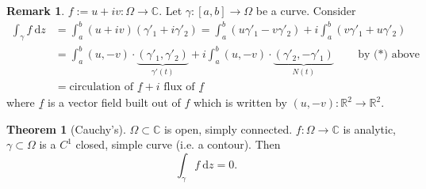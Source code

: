 \documentclass[a4paper]{article}
\theoremstyle{definition}
\newtheorem{thm}[defn]{Theorem}
\newtheorem*{remark}{Remark}
\begin{document}
\begin{remark}
$f:=u+iv: \Omega \rightarrow \mathbb C$. Let $\gamma:[a,b]\rightarrow \Omega$ be a curve. Consider
\[
\begin{aligned}
\int_\gamma f \ \mathrm d z &= \int_a^b (u+iv) (\gamma'_1+i \gamma'_2) = \int_a^b (u\gamma'_1 -v\gamma'_2) +i \int_a^b (v\gamma'_1 + u\gamma'_2) \\&=\int_a^b (u,-v) \cdot \underbrace{(\gamma'_1,\gamma'_2)}_{\gamma'(t)} + i\int_a^b (u,-v) \cdot \underbrace{(\gamma'_2,-\gamma'_1)}_{N(t)} \qquad \text{by ($\ast$) above} \\
&= \text{circulation of }\underline f + i \text{ flux of }\underline f
\end{aligned}
\]
where $\underline f$ is a vector field built out of $f$ which is written by $(u,-v):\mathbb R^2\rightarrow \mathbb R^2$.
\end{remark}
\begin{thm}[Cauchy's]
$\Omega \subset \mathbb C$ is open, simply connected. $f:\Omega \rightarrow \mathbb C$ is analytic, $\gamma \subset \Omega$ is a $C^1$ closed, simple curve (i.e. a contour). Then
\[
\int_\gamma f \ \mathrm d z=0.
\]
\end{thm}
\end{document}

